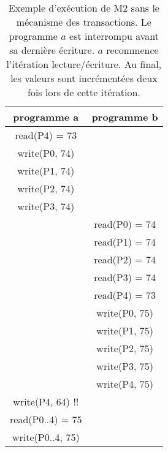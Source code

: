 \documentclass[a4paper,11pt]{article}
\begin{document}
\appendix

\begin{table}
\label{M2}
\caption{Exemple d'exécution de  M2  sans le mécanisme des transactions.
Le programme $a$ est interrompu avant sa dernière écriture. 
$a$ recommence l'itération lecture/écriture.
Au final, les valeurs sont incrémentées deux fois lors de cette itération.
}

\begin{center}
\begin{tabular}{|c|c|}
\hline 
programme a & programme b\tabularnewline
\hline 
\hline 
read(P4) = 73 & \tabularnewline
\hline 
write(P0, 74) & \tabularnewline
\hline 
write(P1, 74) & \tabularnewline
\hline 
write(P2, 74) & \tabularnewline
\hline 
write(P3, 74) & \tabularnewline
\hline 
 & read(P0) = 74\tabularnewline
\hline 
 & read(P1) = 74\tabularnewline
\hline 
 & read(P2) = 74\tabularnewline
\hline 
 & read(P3) = 74\tabularnewline
\hline 
 & read(P4) = 73\tabularnewline
\hline 
 & write(P0, 75)\tabularnewline
\hline 
 & write(P1, 75)\tabularnewline
\hline 
 & write(P2, 75)\tabularnewline
\hline 
 & write(P3, 75)\tabularnewline
\hline 
 & write(P4, 75)\tabularnewline
\hline 
write(P4, 64) !! & \tabularnewline
\hline 
read(P0..4) = 75 & \tabularnewline
\hline 
write(P0..4, 75) & \tabularnewline
\hline 
\end{tabular}
\end{center}
\end{table}
\end{document}

